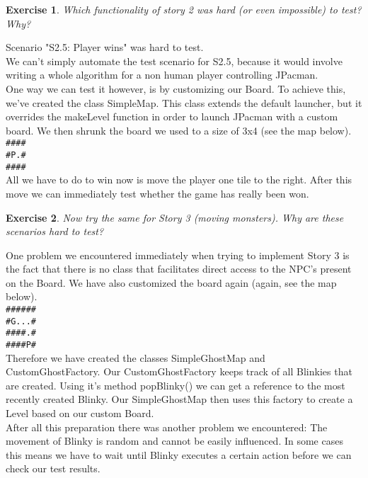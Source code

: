 \documentclass[a4paper]{article}
\newtheorem{thm}{Exercise}
\begin{document}
	\newpage
    \begin{thm}
      Which functionality of story 2 was hard (or even impossible) to test? Why?
    \end{thm}
    Scenario "S2.5: Player wins" was hard to test. \\
    We can't simply automate the test scenario for S2.5, because it would involve writing a whole algorithm for a non human player controlling JPacman. \\
    One way we can test it however, is by customizing our Board. To achieve this, we've created the class SimpleMap.
    This class extends the default launcher, but it overrides the makeLevel function in order to launch JPacman with a custom board. 
    We then shrunk the board we used to a size of 3x4 (see the map below). \\
    \verb|####| \\
    \verb|#P.#| \\
    \verb|####| \\
    All we have to do to win now is move the player one tile to the right. After this move we can immediately test whether the game has really been won.


    \begin{thm}
      Now try the same for Story 3 (moving monsters). Why are these scenarios hard to test?
    \end{thm}
    One problem we encountered immediately when trying to implement Story 3 is the fact that there is no class that facilitates direct access to the NPC's present on the Board.
    We have also customized the board again (again, see the map below). \\
    \verb|######| \\
	\verb|#G...#| \\
	\verb|####.#| \\
	\verb|####P#| \\
    Therefore we have created the classes SimpleGhostMap and CustomGhostFactory.
	Our CustomGhostFactory keeps track of all Blinkies that are created. Using it's method popBlinky() we can get a reference to the most recently created Blinky.
	Our SimpleGhostMap then uses this factory to create a Level based on our custom Board. \\
	After all this preparation there was another problem we encountered: The movement of Blinky is random and cannot be easily influenced.
	In some cases this means we have to wait until Blinky executes a certain action before we can check our test results.
    
\end{document}
